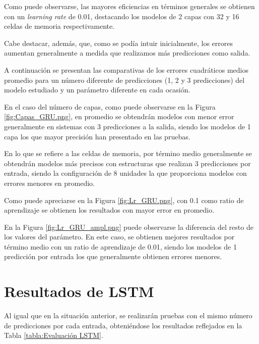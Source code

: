Como puede observarse, las mayores eficiencias en términos generales se obtienen 
con un \textit{learning rate} de 0.01, destacando los modelos de 2 capas con 
32 y 16 celdas de memoria respectivamente.

Cabe destacar, además, que, como se podía intuir inicialmente, los errores aumentan generalmente
a medida que realizamos más predicciones como salida.

A continuación se presentan las comparativas de los errores cuadráticos medios promedio para un número
diferente de predicciones (1, 2 y 3 predicciones) del modelo estudiado y un parámetro diferente en cada
ocasión.

En el caso del número de capas, como puede observarse en la Figura \ref{fig:Capas_GRU.png}, en promedio
se obtendrán modelos con menor error generalmente en sistemas con 3 predicciones a la salida, siendo los 
modelos de 1 capa los que mayor precisión han presentado en las pruebas.

En lo que se refiere a las celdas de memoria, por término medio generalmente se obtendrán modelos más
precisos con estructuras que realizan 3 predicciones por entrada, siendo la configuración de 8 unidades 
la que proporciona modelos con errores menores en promedio.

Como puede apreciarse en la Figura \ref{fig:Lr_GRU.png}, con 0.1 como ratio de aprendizaje se obtienen los
resultados con mayor error en promedio.

En la Figura \ref{fig:Lr_GRU_ampl.png} puede observarse la diferencia del resto de los valores del 
parámetro. En este caso, se obtienen mejores resultados por término medio con un ratio de aprendizaje de
0.01, siendo los modelos de 1 predicción por entrada los que generalmente obtienen errores menores.

\newpage

\section{Resultados de LSTM}
Al igual que en la situación anterior, se realizarán pruebas con el mismo número de predicciones
por cada entrada, obteniéndose los resultados reflejados en la Tabla \ref{tabla:Evaluación LSTM}.

